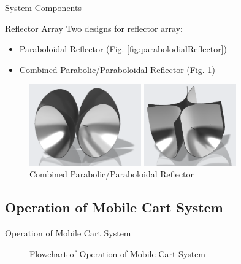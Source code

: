 \documentclass{beamer}
\begin{document}
\begin{frame}{System Components}
    \begin{block}{Reflector Array}
    Two designs for reflector array:
    \begin{itemize}
      \item Paraboloidal Reflector (Fig. \ref{fig:parabolodialReflector})
      \item Combined Parabolic/Paraboloidal Reflector (Fig. \ref{fig:parabolicReflector})
    \end{itemize}
    \end{block}
    \begin{figure}
      \centering
      \begin{minipage}[t]{0.5\textwidth}
        \centering
        \includegraphics[height=3.5cm]{figs/img/paraboloidalReflector}
        \caption{Paraboloidal Reflector Model}
        \label{fig:parabolodialReflector}
      \end{minipage}
      \begin{minipage}[t]{0.4\textwidth}
        \centering
        \includegraphics[height=3.5cm]{figs/img/parabolicReflector}
        \caption{Combined Parabolic/Paraboloidal Reflector}
        \label{fig:parabolicReflector}
      \end{minipage}
    \end{figure}
\end{frame}


\subsection{Operation of Mobile Cart System}
\begin{frame}{Operation of Mobile Cart System}
  \begin{figure}
    \centering
    \begingroup
    \tiny
    
    \endgroup
    \caption{Flowchart of Operation of Mobile Cart System}
    \label{fig:sysOpFlowchart}
  \end{figure}
\end{frame}
\end{document}
